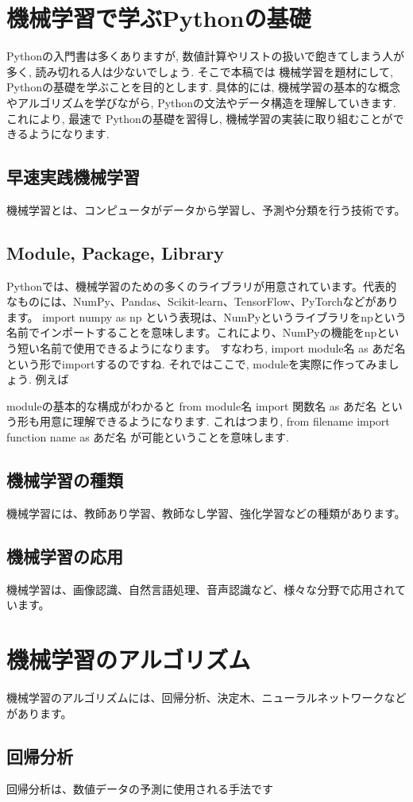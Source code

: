 \documentclass{ltjsarticle}      %
\begin{document}
\section{機械学習で学ぶPythonの基礎}
 Pythonの入門書は多くありますが, 数値計算やリストの扱いで飽きてしまう人が多く, 読み切れる人は少ないでしょう. そこで本稿では
 機械学習を題材にして, Pythonの基礎を学ぶことを目的とします. 具体的には, 機械学習の基本的な概念やアルゴリズムを学びながら, 
 Pythonの文法やデータ構造を理解していきます. これにより, 最速で Pythonの基礎を習得し, 機械学習の実装に取り組むことができるようになります.
\subsection{早速実践機械学習}
 機械学習とは、コンピュータがデータから学習し、予測や分類を行う技術です。
\subsection{Module, Package, Library}
 Pythonでは、機械学習のための多くのライブラリが用意されています。代表的なものには、NumPy、Pandas、Scikit-learn、TensorFlow、PyTorchなどがあります。
 import numpy as np
 という表現は、NumPyというライブラリをnpという名前でインポートすることを意味します。これにより、NumPyの機能をnpという短い名前で使用できるようになります。
 すなわち, import module名 as あだ名 という形でimportするのですね.
 それではここで, moduleを実際に作ってみましょう. 例えば

 moduleの基本的な構成がわかると
 from module名  import 関数名 as あだ名
 という形も用意に理解できるようになります. これはつまり, from filename import function name as あだ名 が可能ということを意味します.
\subsection{機械学習の種類}
 機械学習には、教師あり学習、教師なし学習、強化学習などの種類があります。
\subsection{機械学習の応用}
 機械学習は、画像認識、自然言語処理、音声認識など、様々な分野で応用されています。
\section{機械学習のアルゴリズム}
 機械学習のアルゴリズムには、回帰分析、決定木、ニューラルネットワークなどがあります。
\subsection{回帰分析}
 回帰分析は、数値データの予測に使用される手法です
\end{document}
